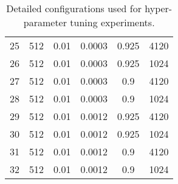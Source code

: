 \documentclass[a4paper,12pt]{article}
\begin{document}
\begin{table}[h!]
\begin{tabular}{|c|c|c|c|c|c|}
25 & 512 & 0.01   & 0.0003 & 0.925 & 4120 \\
26 & 512 & 0.01   & 0.0003 & 0.925 & 1024 \\
27 & 512 & 0.01   & 0.0003       & 0.9   & 4120 \\
28 & 512 & 0.01   & 0.0003       & 0.9   & 1024 \\
29 & 512 & 0.01   & 0.0012       & 0.925 & 4120 \\
30 & 512 & 0.01   & 0.0012       & 0.925 & 1024 \\
31 & 512 & 0.01   & 0.0012       & 0.9   & 4120 \\
32 & 512 & 0.01   & 0.0012       & 0.9   & 1024 \\
\hline
\end{tabular}
\caption{Detailed configurations used for hyper-parameter tuning experiments.}
\end{table}



\end{document}
